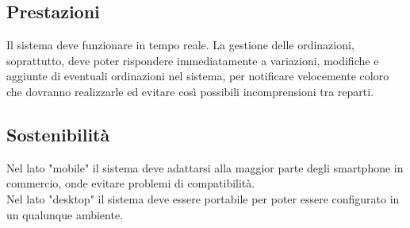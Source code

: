 \subsection{Prestazioni}
Il sistema deve funzionare in tempo reale. La gestione delle ordinazioni, soprattutto, deve poter rispondere immediatamente a variazioni, modifiche e aggiunte di eventuali ordinazioni nel sistema, per notificare velocemente coloro che dovranno realizzarle ed evitare così possibili incomprensioni tra reparti.

\subsection{Sostenibilità}
Nel lato "mobile" il sistema deve adattarsi alla maggior parte degli smartphone in commercio, onde evitare problemi di compatibilità. \\
Nel lato "desktop" il sistema deve essere portabile per poter essere configurato in un qualunque ambiente. 




